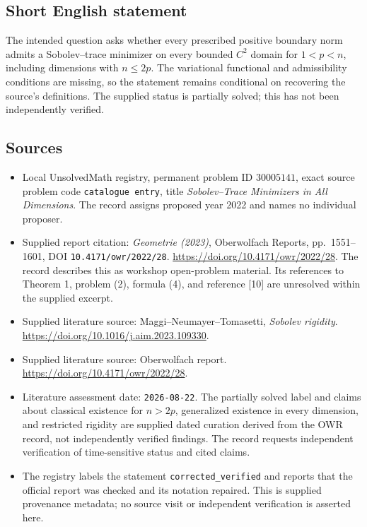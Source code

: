 \documentclass[11pt]{article}
\begin{document}
\subsection{Short English statement}
The intended question asks whether every prescribed positive boundary norm admits a Sobolev--trace minimizer on every bounded \(C^2\) domain for \(1<p<n\), including dimensions with \(n\leq2p\). The variational functional and admissibility conditions are missing, so the statement remains conditional on recovering the source's definitions. The supplied status is partially solved; this has not been independently verified.
\subsection{Sources}
\begin{itemize}
\item Local UnsolvedMath registry, permanent problem ID \(30005141\), exact source problem code \texttt{catalogue entry}, title \emph{Sobolev--Trace Minimizers in All Dimensions}. The record assigns proposed year 2022 and names no individual proposer.
\item Supplied report citation: \emph{Geometrie (2023)}, Oberwolfach Reports, pp.~1551--1601, DOI \texttt{10.4171/owr/2022/28}. \url{https://doi.org/10.4171/owr/2022/28}. The record describes this as workshop open-problem material. Its references to Theorem 1, problem (2), formula (4), and reference [10] are unresolved within the supplied excerpt.
\item Supplied literature source: Maggi--Neumayer--Tomasetti, \emph{Sobolev rigidity}. \url{https://doi.org/10.1016/j.aim.2023.109330}.
\item Supplied literature source: Oberwolfach report. \url{https://doi.org/10.4171/owr/2022/28}.
\item Literature assessment date: \texttt{2026-08-22}. The partially solved label and claims about classical existence for \(n>2p\), generalized existence in every dimension, and restricted rigidity are supplied dated curation derived from the OWR record, not independently verified findings. The record requests independent verification of time-sensitive status and cited claims.
\item The registry labels the statement \texttt{corrected\_verified} and reports that the official report was checked and its notation repaired. This is supplied provenance metadata; no source visit or independent verification is asserted here.
\end{itemize}
\end{document}
